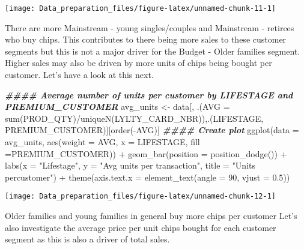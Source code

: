 \documentclass[
]{article}
\newenvironment{Shaded}{\begin{snugshade}}{\end{snugshade}}
\newcommand{\AttributeTok}[1]{\textcolor[rgb]{0.77,0.63,0.00}{#1}}
\newcommand{\DecValTok}[1]{\textcolor[rgb]{0.00,0.00,0.81}{#1}}
\newcommand{\DocumentationTok}[1]{\textcolor[rgb]{0.56,0.35,0.01}{\textbf{\textit{#1}}}}
\newcommand{\FloatTok}[1]{\textcolor[rgb]{0.00,0.00,0.81}{#1}}
\newcommand{\FunctionTok}[1]{\textcolor[rgb]{0.00,0.00,0.00}{#1}}
\newcommand{\NormalTok}[1]{#1}
\newcommand{\OtherTok}[1]{\textcolor[rgb]{0.56,0.35,0.01}{#1}}
\newcommand{\SpecialCharTok}[1]{\textcolor[rgb]{0.00,0.00,0.00}{#1}}
\newcommand{\StringTok}[1]{\textcolor[rgb]{0.31,0.60,0.02}{#1}}
\begin{document}
\begin{center}\texttt{[image: Data\_preparation\_files/figure-latex/unnamed-chunk-11-1]} \end{center}

There are more Mainstream - young singles/couples and Mainstream -
retirees who buy chips. This contributes to there being more sales to
these customer segments but this is not a major driver for the Budget -
Older families segment. Higher sales may also be driven by more units of
chips being bought per customer. Let's have a look at this next.

\begin{Shaded}
\begin{Highlighting}[]
\DocumentationTok{\#\#\#\# Average number of units per customer by LIFESTAGE and PREMIUM\_CUSTOMER}
\NormalTok{avg\_units }\OtherTok{\textless{}{-}}\NormalTok{ data[, .(}\AttributeTok{AVG =} \FunctionTok{sum}\NormalTok{(PROD\_QTY)}\SpecialCharTok{/}\FunctionTok{uniqueN}\NormalTok{(LYLTY\_CARD\_NBR)),.(LIFESTAGE, PREMIUM\_CUSTOMER)][}\FunctionTok{order}\NormalTok{(}\SpecialCharTok{{-}}\NormalTok{AVG)]}
\DocumentationTok{\#\#\#\# Create plot}
\FunctionTok{ggplot}\NormalTok{(}\AttributeTok{data =}\NormalTok{ avg\_units, }\FunctionTok{aes}\NormalTok{(}\AttributeTok{weight =}\NormalTok{ AVG, }\AttributeTok{x =}\NormalTok{ LIFESTAGE, }\AttributeTok{fill =}\NormalTok{PREMIUM\_CUSTOMER)) }\SpecialCharTok{+}
\FunctionTok{geom\_bar}\NormalTok{(}\AttributeTok{position =} \FunctionTok{position\_dodge}\NormalTok{()) }\SpecialCharTok{+}
\FunctionTok{labs}\NormalTok{(}\AttributeTok{x =} \StringTok{"Lifestage"}\NormalTok{, }\AttributeTok{y =} \StringTok{"Avg units per transaction"}\NormalTok{, }\AttributeTok{title =} \StringTok{"Units percustomer"}\NormalTok{) }\SpecialCharTok{+}
\FunctionTok{theme}\NormalTok{(}\AttributeTok{axis.text.x =} \FunctionTok{element\_text}\NormalTok{(}\AttributeTok{angle =} \DecValTok{90}\NormalTok{, }\AttributeTok{vjust =} \FloatTok{0.5}\NormalTok{))}
\end{Highlighting}
\end{Shaded}

\begin{center}\texttt{[image: Data\_preparation\_files/figure-latex/unnamed-chunk-12-1]} \end{center}

Older families and young families in general buy more chips per customer
Let's also investigate the average price per unit chips bought for each
customer segment as this is also a driver of total sales.
\end{document}
